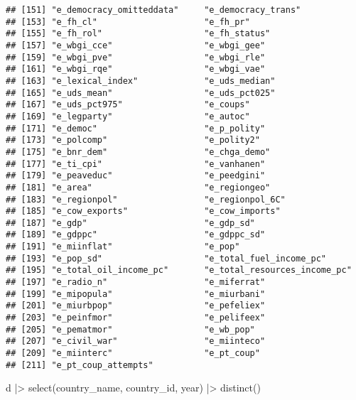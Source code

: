 \documentclass[
]{article}
\newenvironment{Shaded}{\begin{snugshade}}{\end{snugshade}}
\newcommand{\FunctionTok}[1]{\textcolor[rgb]{0.00,0.00,0.00}{#1}}
\newcommand{\NormalTok}[1]{#1}
\newcommand{\SpecialCharTok}[1]{\textcolor[rgb]{0.00,0.00,0.00}{#1}}
\begin{document}
\begin{verbatim}
## [151] "e_democracy_omitteddata"     "e_democracy_trans"          
## [153] "e_fh_cl"                     "e_fh_pr"                    
## [155] "e_fh_rol"                    "e_fh_status"                
## [157] "e_wbgi_cce"                  "e_wbgi_gee"                 
## [159] "e_wbgi_pve"                  "e_wbgi_rle"                 
## [161] "e_wbgi_rqe"                  "e_wbgi_vae"                 
## [163] "e_lexical_index"             "e_uds_median"               
## [165] "e_uds_mean"                  "e_uds_pct025"               
## [167] "e_uds_pct975"                "e_coups"                    
## [169] "e_legparty"                  "e_autoc"                    
## [171] "e_democ"                     "e_p_polity"                 
## [173] "e_polcomp"                   "e_polity2"                  
## [175] "e_bnr_dem"                   "e_chga_demo"                
## [177] "e_ti_cpi"                    "e_vanhanen"                 
## [179] "e_peaveduc"                  "e_peedgini"                 
## [181] "e_area"                      "e_regiongeo"                
## [183] "e_regionpol"                 "e_regionpol_6C"             
## [185] "e_cow_exports"               "e_cow_imports"              
## [187] "e_gdp"                       "e_gdp_sd"                   
## [189] "e_gdppc"                     "e_gdppc_sd"                 
## [191] "e_miinflat"                  "e_pop"                      
## [193] "e_pop_sd"                    "e_total_fuel_income_pc"     
## [195] "e_total_oil_income_pc"       "e_total_resources_income_pc"
## [197] "e_radio_n"                   "e_miferrat"                 
## [199] "e_mipopula"                  "e_miurbani"                 
## [201] "e_miurbpop"                  "e_pefeliex"                 
## [203] "e_peinfmor"                  "e_pelifeex"                 
## [205] "e_pematmor"                  "e_wb_pop"                   
## [207] "e_civil_war"                 "e_miinteco"                 
## [209] "e_miinterc"                  "e_pt_coup"                  
## [211] "e_pt_coup_attempts"
\end{verbatim}

\begin{Shaded}
\begin{Highlighting}[]
\NormalTok{d }\SpecialCharTok{|\textgreater{}} \FunctionTok{select}\NormalTok{(country\_name, country\_id, year) }\SpecialCharTok{|\textgreater{}}
  \FunctionTok{distinct}\NormalTok{()}
\end{Highlighting}
\end{Shaded}
\end{document}
